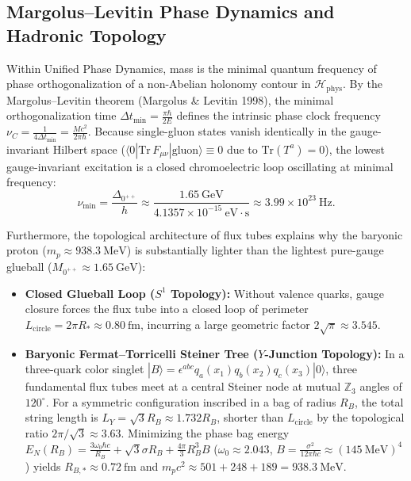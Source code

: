 \documentclass[11pt, a4paper]{article}
\theoremstyle{definition}
\theoremstyle{remark}
\begin{document}
\subsection{Margolus--Levitin Phase Dynamics and Hadronic Topology}

Within Unified Phase Dynamics, mass is the minimal quantum frequency of phase orthogonalization of a non-Abelian holonomy contour in $\mathcal{H}_{\mathrm{phys}}$. By the Margolus--Levitin theorem (Margolus \& Levitin 1998), the minimal orthogonalization time $\Delta t_{\min} = \frac{\pi\hbar}{2E}$ defines the intrinsic phase clock frequency $\nu_{C} = \frac{1}{4\Delta t_{\min}} = \frac{Mc^{2}}{2\pi\hbar}$. Because single-gluon states vanish identically in the gauge-invariant Hilbert space ($\langle 0 | \mathrm{Tr}\,F_{\mu\nu} | \mathrm{gluon}\rangle \equiv 0$ due to $\mathrm{Tr}(T^{a}) = 0$), the lowest gauge-invariant excitation is a closed chromoelectric loop oscillating at minimal frequency:
\begin{equation}
  \nu_{\min} = \frac{\Delta_{0^{++}}}{h} \approx \frac{1.65~\mathrm{GeV}}{4.1357 \times 10^{-15}~\mathrm{eV}\cdot\mathrm{s}} \approx 3.99 \times 10^{23}~\mathrm{Hz}.
\end{equation}

Furthermore, the topological architecture of flux tubes explains why the baryonic proton ($m_{p} \approx 938.3~\mathrm{MeV}$) is substantially lighter than the lightest pure-gauge glueball ($M_{0^{++}} \approx 1.65~\mathrm{GeV}$):
\begin{itemize}
  \item \textbf{Closed Glueball Loop ($S^{1}$ Topology):} Without valence quarks, gauge closure forces the flux tube into a closed loop of perimeter $L_{\mathrm{circle}} = 2\pi R_{*} \approx 0.80~\mathrm{fm}$, incurring a large geometric factor $2\sqrt{\pi} \approx 3.545$.
  \item \textbf{Baryonic Fermat--Torricelli Steiner Tree ($Y$-Junction Topology):} In a three-quark color singlet $|B\rangle = \epsilon^{abc}q_{a}(x_{1})q_{b}(x_{2})q_{c}(x_{3})|0\rangle$, three fundamental flux tubes meet at a central Steiner node at mutual $\mathbb{Z}_{3}$ angles of $120^{\circ}$. For a symmetric configuration inscribed in a bag of radius $R_{B}$, the total string length is $L_{Y} = \sqrt{3}R_{B} \approx 1.732 R_{B}$, shorter than $L_{\mathrm{circle}}$ by the topological ratio $2\pi/\sqrt{3} \approx 3.63$. Minimizing the phase bag energy $E_{N}(R_{B}) = \frac{3\omega_{0}\hbar c}{R_{B}} + \sqrt{3}\sigma R_{B} + \frac{4\pi}{3}R_{B}^{3}B$ ($\omega_{0} \approx 2.043$, $B = \frac{\sigma^{2}}{12\pi\hbar c} \approx (145~\mathrm{MeV})^{4}$) yields $R_{B,*} \approx 0.72~\mathrm{fm}$ and $m_{p}c^{2} \approx 501 + 248 + 189 = 938.3~\mathrm{MeV}$.
\end{itemize}
\end{document}
